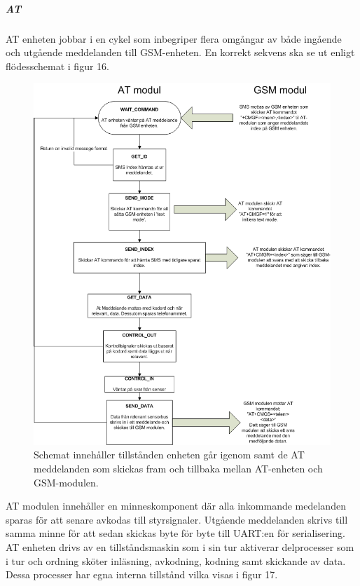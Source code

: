 \documentclass[a4paper]{scrartcl}
\begin{document}
		\subparagraph{AT}
		AT enheten jobbar i en cykel som inbegriper flera omgångar av både ingående och utgående meddelanden till GSM-enheten. En korrekt sekvens ska se ut enligt flödesschemat i figur 16. 
		\begin{figure}[it ]
			\centering
			\includegraphics[scale=0.6]{atflow.png}
			\caption{Schemat innehåller tillstånden enheten går igenom samt de AT meddelanden som skickas fram och tillbaka mellan AT-enheten och GSM-modulen.}
		\end{figure}

		AT modulen innehåller en minneskomponent där alla inkommande medelanden sparas för att senare avkodas till styrsignaler. Utgående meddelanden skrivs till samma minne för att sedan skickas byte för byte till UART:en för serialisering.
		AT enheten drivs av en tillståndsmaskin som i sin tur aktiverar delprocesser som i tur och ordning sköter inläsning, avkodning, kodning samt skickande av data. Dessa processer har egna interna tillstånd vilka visas i figur 17.
\end{document}
